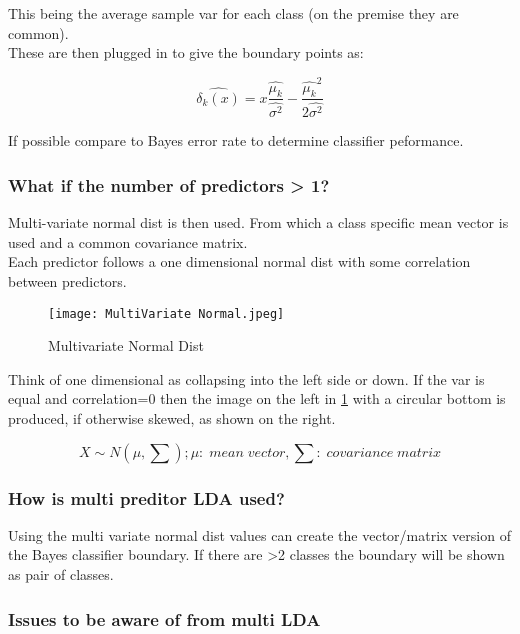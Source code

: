 \documentclass[11pt]{scrartcl} %
\begin{document}
This being the average sample var for each class (on the premise they are common).\\

These are then plugged in to give the boundary points as:

\begin{equation}
	\hat{\delta_k(x)} = x\frac{\hat{\mu_k}}{\hat{\sigma^2}} - \frac{\hat{\mu_k}^2}{2\hat{\sigma^2}}
\end{equation}

If possible compare to Bayes error rate to determine classifier peformance.

\subsubsection{What if the number of predictors > 1?}

Multi-variate normal dist is then used. From which a class specific mean vector is used and a common covariance matrix.\\

Each predictor follows a one dimensional normal dist with some correlation between predictors.

\begin{figure}[h] %
	\centering
	\texttt{[image: MultiVariate Normal.jpeg]} %
	\caption{Multivariate Normal Dist}
	\label{multi-normal}
\end{figure}

Think of one dimensional as collapsing into the left side or down. If the var is equal and correlation=0
then the image on the left in \ref{multi-normal} with a circular bottom is produced, if otherwise skewed,
as shown on the right.

\begin{equation}
	X \sim N(\mu,\sum); \mu:\; mean\; vector, \sum:\; covariance\; matrix
\end{equation}

\subsubsection{How is multi preditor LDA used?}

Using the multi variate normal dist values can create the vector/matrix version of the Bayes 
classifier boundary. If there are >2 classes the boundary will be shown as pair of classes.

\subsubsection{Issues to be aware of from multi LDA}
\end{document}
